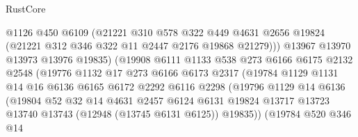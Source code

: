 \begin{lexlean}{RustCore}
\begin{coremodule}
                              @1126
                              @450
                              @6109
                              (@21221
                                @310
                                @578
                                @322
                                @449
                                @4631
                                @2656
                                @19824
                                (@21221 @312 @346 @322 @11 @2447 @2176 @19868 @21279)))
                            @13967
                            @13970
                            @13973
                            @13976
                            @19835)
                          (@19908
                            @6111
                            @1133
                            @538
                            @273
                            @6166
                            @6175
                            @2132
                            @2548
                            (@19776
                              @1132
                              @17
                              @273
                              @6166
                              @6173
                              @2317
                              (@19784
                                @1129
                                @1131
                                @14
                                @16
                                @6136
                                @6165
                                @6172
                                @2292
                                @6116
                                @2298
                                (@19796
                                  @1129
                                  @14
                                  @6136
                                  (@19804
                                    @52
                                    @32
                                    @14
                                    @4631
                                    @2457
                                    @6124
                                    @6131
                                    @19824
                                    @13717
                                    @13723
                                    @13740
                                    @13743
                                    (@12948 (@13745 @6131 @6125))
                                    @19835))
                                (@19784
                                  @520
                                  @346
                                  @14

\end{coremodule}
\end{lexlean}
